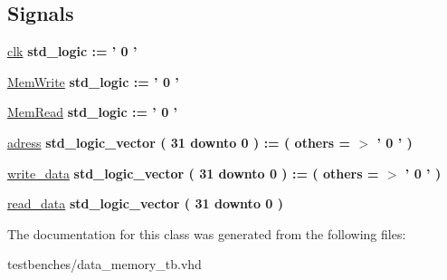 \subsection*{\-Signals}
 \begin{DoxyCompactItemize}
\item 
\hypertarget{classdata__memory__tb_1_1behavior_a02e01e59b5f6f9ed85c3e44abcd3d3b0}{\hyperlink{classdata__memory__tb_1_1behavior_a02e01e59b5f6f9ed85c3e44abcd3d3b0}{clk} {\bfseries std\-\_\-logic  \-:= '  0  ' } }\label{classdata__memory__tb_1_1behavior_a02e01e59b5f6f9ed85c3e44abcd3d3b0}

\item 
\hypertarget{classdata__memory__tb_1_1behavior_a721e0bf40b8b405a548bc525862a7c92}{\hyperlink{classdata__memory__tb_1_1behavior_a721e0bf40b8b405a548bc525862a7c92}{\-Mem\-Write} {\bfseries std\-\_\-logic  \-:= '  0  ' } }\label{classdata__memory__tb_1_1behavior_a721e0bf40b8b405a548bc525862a7c92}

\item 
\hypertarget{classdata__memory__tb_1_1behavior_a2c9243ab9101de83bddc0c7339542554}{\hyperlink{classdata__memory__tb_1_1behavior_a2c9243ab9101de83bddc0c7339542554}{\-Mem\-Read} {\bfseries std\-\_\-logic  \-:= '  0  ' } }\label{classdata__memory__tb_1_1behavior_a2c9243ab9101de83bddc0c7339542554}

\item 
\hypertarget{classdata__memory__tb_1_1behavior_ad00e55d610ace0812e82bd88e7bfc072}{\hyperlink{classdata__memory__tb_1_1behavior_ad00e55d610ace0812e82bd88e7bfc072}{adress} {\bfseries std\-\_\-logic\-\_\-vector (   31    downto    0  )  \-:= (  others  = $>$ '  0  '  ) } }\label{classdata__memory__tb_1_1behavior_ad00e55d610ace0812e82bd88e7bfc072}

\item 
\hypertarget{classdata__memory__tb_1_1behavior_a132a1487bc7afa2de397e2c6f1b4f576}{\hyperlink{classdata__memory__tb_1_1behavior_a132a1487bc7afa2de397e2c6f1b4f576}{write\-\_\-data} {\bfseries std\-\_\-logic\-\_\-vector (   31    downto    0  )  \-:= (  others  = $>$ '  0  '  ) } }\label{classdata__memory__tb_1_1behavior_a132a1487bc7afa2de397e2c6f1b4f576}

\item 
\hypertarget{classdata__memory__tb_1_1behavior_a0ffc759f5a888e5c7c7b770e1d0829a8}{\hyperlink{classdata__memory__tb_1_1behavior_a0ffc759f5a888e5c7c7b770e1d0829a8}{read\-\_\-data} {\bfseries std\-\_\-logic\-\_\-vector (   31    downto    0  ) } }\label{classdata__memory__tb_1_1behavior_a0ffc759f5a888e5c7c7b770e1d0829a8}

\end{DoxyCompactItemize}


\-The documentation for this class was generated from the following files\-:\begin{DoxyCompactItemize}
\item 
testbenches/data\-\_\-memory\-\_\-tb.\-vhd\end{DoxyCompactItemize}
